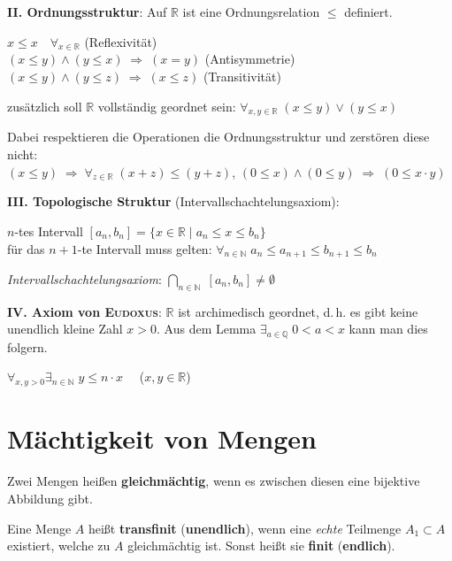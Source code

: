 \vspace{12pt}
\linie

\textbf{II. Ordnungsstruktur}: Auf $\mathbb{R}$ ist eine Ordnungsrelation $\le$
definiert.

$x \le x \quad \forall_{x \in \mathbb{R}}$ (Reflexivität) \\
$(x \le y) \land (y \le x) \;\Rightarrow\; (x = y)$ (Antisymmetrie) \\
$(x \le y) \land (y \le z) \;\Rightarrow\; (x \le z)$ (Transitivität)

zusätzlich soll $\mathbb{R}$ vollständig geordnet sein:
$\forall_{x, y \in \mathbb{R}}\; (x \le y) \lor (y \le x)$

Dabei respektieren die Operationen die Ordnungsstruktur und zerstören diese
nicht: \\
$(x \le y) \;\Rightarrow\; \forall_{z \in \mathbb{R}}\; (x + z) \le (y + z)$,
\qquad
$(0 \le x) \land (0 \le y) \;\Rightarrow\; (0 \le x \cdot y)$

\linie

\textbf{III. Topologische Struktur} (Intervallschachtelungsaxiom):

$n$-tes Intervall
$[a_n, b_n] = \{x \in \mathbb{R} \;|\; a_n \le x \le b_n\}$ \\
für das $n+1$-te Intervall muss gelten:
$\forall_{n \in \mathbb{N}}\; a_n \le a_{n+1} \le b_{n+1} \le b_n$

\emph{Intervallschachtelungsaxiom}:
$\bigcap_{n \in \mathbb{N}}\; [a_n, b_n] \not= \emptyset$

\linie

\textbf{IV. Axiom von \textsc{Eudoxus}}: $\mathbb{R}$ ist archimedisch
geordnet, d.\,h. es gibt keine unendlich kleine Zahl $x > 0$.
Aus dem Lemma $\exists_{a \in \mathbb{Q}}\; 0 < a < x$ kann man dies folgern.

$\forall_{x, y > 0} \exists_{n \in \mathbb{N}}\; y \le n \cdot x \quad$
($x, y \in \mathbb{R}$)

\section{%
    Mächtigkeit von Mengen%
}

Zwei Mengen heißen \textbf{gleichmächtig}, wenn es zwischen diesen eine
bijektive Abbildung gibt.

Eine Menge $A$ heißt \textbf{transfinit} (\textbf{unendlich}), wenn eine
\emph{echte} Teilmenge $A_1 \subset A$ existiert, welche zu $A$ gleichmächtig
ist. Sonst heißt sie \textbf{finit} (\textbf{endlich}).


